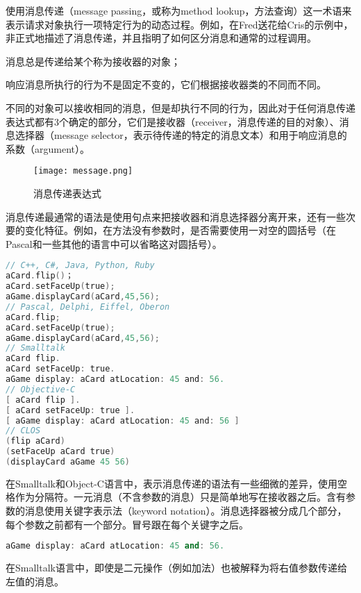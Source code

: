 使用消息传递（message passing，或称为method lookup，方法查询）这一术语来表示请求对象执行一项特定行为的动态过程。例如，在Fred送花给Cris的示例中，非正式地描述了消息传递，并且指明了如何区分消息和通常的过程调用。

\begin{compactitem}
\item 消息总是传递给某个称为接收器的对象；
\item 响应消息所执行的行为不是固定不变的，它们根据接收器类的不同而不同。
\end{compactitem}

不同的对象可以接收相同的消息，但是却执行不同的行为，因此对于任何消息传递表达式都有3个确定的部分，它们是接收器（receiver，消息传递的目的对象）、消息选择器（message selector，表示待传递的特定的消息文本）和用于响应消息的系数（argument）。

\begin{figure}[htbp]
\centering
\texttt{[image: message.png]}
\caption{消息传递表达式}
\label{fig:message}
\end{figure}

消息传递最通常的语法是使用句点来把接收器和消息选择器分离开来，还有一些次要的变化特征。例如，在方法没有参数时，是否需要使用一对空的圆括号（在Pascal和一些其他的语言中可以省略这对圆括号）。

\begin{lstlisting}[language=C]
// C++, C#, Java, Python, Ruby
aCard.flip()；
aCard.setFaceUp(true);
aGame.displayCard(aCard,45,56);
// Pascal, Delphi, Eiffel, Oberon
aCard.flip;
aCard.setFaceUp(true);
aGame.displayCard(aCard,45,56);
// Smalltalk
aCard flip.
aCard setFaceUp: true.
aGame display: aCard atLocation: 45 and: 56.
// Objective-C
[ aCard flip ].
[ aCard setFaceUp: true ].
[ aGame display: aCard atLocation: 45 and: 56 ]
// CLOS
(flip aCard)
(setFaceUp aCard true)
(displayCard aGame 45 56)
\end{lstlisting}

在Smalltalk和Object-C语言中，表示消息传递的语法有一些细微的差异，使用空格作为分隔符。一元消息（不含参数的消息）只是简单地写在接收器之后。含有参数的消息使用关键字表示法（keyword notation）。消息选择器被分成几个部分，每个参数之前都有一个部分。冒号跟在每个关键字之后。

\begin{lstlisting}[language=C++]
aGame display: aCard atLocation: 45 and: 56.
\end{lstlisting}


在Smalltalk语言中，即使是二元操作（例如加法）也被解释为将右值参数传递给左值的消息。

